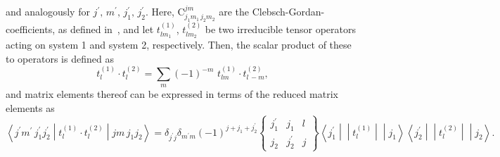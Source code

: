 and analogously for $j^\prime,\, m^\prime,\,j_1^\prime,\,j_2^\prime$. Here, $\text{C}^{jm}_{j_1m_1\,j_2m_2}$ are the Clebsch-Gordan-coefficients, as defined in~\cite[Section 9.]{varshalovich1988}, and let $t^{(1)}_{l m_1}$, $t^{(2)}_{l m_2}$ be two irreducible tensor operators acting on system 1 and system 2, respectively. Then, the scalar product of these to operators is defined as
\begin{equation}
\label{app:tensor_scalarProd}
t^{(1)}_{l}\cdot t^{(2)}_{l} = \sum_{m}(-1)^{-m}\,\, t^{(1)}_{lm}\cdot t^{(2)}_{l\,-m},
\end{equation}
and matrix elements thereof can be expressed in terms of the reduced matrix elements as~\cite{varshalovich1988}
\begin{equation}
\label{app:reducedMatEl_expectation}
\left< j^\prime m ^\prime\,j_1^\prime j_2^\prime \middle| t^{(1)}_{l}\cdot t^{(2)}_{l} \middle| j m \,j_1 j_2\right>
=
\delta_{j^\prime j}\delta_{m^\prime m}(-1)^{j+j_1+j_2^\prime}
\begin{Bmatrix}
j_1^\prime&j_1&l\\
j_2&j_2^\prime&j
\end{Bmatrix}
\left< j_1^\prime\middle|\middle| t^{(1)}_{l}\middle|\middle|j_1\right>
\left< j_2^\prime\middle|\middle| t^{(2)}_{l}\middle|\middle|j_2\right>.
\end{equation}
